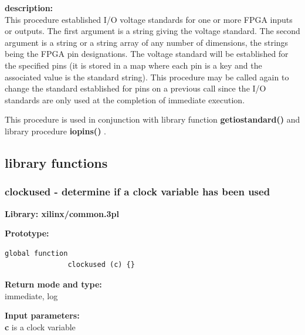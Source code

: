             {\bf description:} \\
            This procedure established I/O voltage standards for one or more FPGA
            inputs or outputs. The first argument is a string giving the voltage
            standard. The second argument is a string or a string array of any
            number of dimensions, the strings being the FPGA pin designations. The
            voltage standard will be established for the specified pins (it is
            stored in a map where each pin is a key and the associated value is the
            standard string). This procedure may be called again to change the
            standard established for pins on a previous call since the I/O
            standards are only used at the completion of immediate execution.
            
            This procedure is used in conjunction with library function {\bf
            getiostandard()}  and library procedure
            {\bf iopins()} .












    \subsection{library functions}




        \subsubsection{clockused - determine if a clock variable has been used}\label{sec:lfclockused}
            
            {\bf Library: xilinx/common.3pl}

            {\bf Prototype:} \\
            \vsp
            \begin{lstlisting}[gobble=12, language=threepl]
               global function
               clockused (c) {}
            \end{lstlisting}

            {\bf Return mode and type:} \\
            immediate, log

            {\bf Input parameters:} \\            
            {\bf c} is a clock variable

